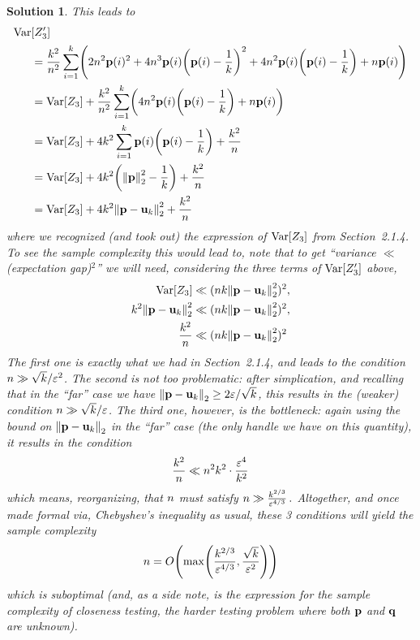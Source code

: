 \documentclass[biber]{nowfnt} %
\newtheorem{solution}{Solution}[chapter]
\begin{document}
\begin{solution}
This leads to
\begin{align*}
      \Var&[Z'_3] \\
      &= \frac{\ab^2}{\ns^2}\sum_{i=1}^\ab \Paren{2\ns^2\p (i)^2 + 4\ns^3\p(i)\Paren{\p(i)-\frac{1}{\ab}} ^2 + 4\ns^2\p(i)\Paren{\p(i)-\frac{1}{\ab}} + \ns\p(i)} \\
      &= \Var[Z_3] + \frac{\ab^2}{\ns^2}\sum_{i=1}^\ab \Paren{4\ns^2\p(i)\Paren{\p(i)-\frac{1}{\ab}} + \ns\p(i)} \\
      &= \Var[Z_3] + 4\ab^2\sum_{i=1}^\ab \p(i)\Paren{\p(i)-\frac{1}{\ab}} + \frac{\ab^2}{\ns}\\
      &= \Var[Z_3] + 4\ab^2\Paren{\normtwo{\p}^2 - \frac{1}{\ab}} + \frac{\ab^2}{\ns} \\
      &= \Var[Z_3] + 4\ab^2\normtwo{\p - \uniformOn{\ab}}^2 + \frac{\ab^2}{\ns}
\end{align*}
where we recognized (and took out) the expression of $\operatorname{Var}[Z_3]$ from Section~2.1.4. To see the sample complexity this would lead to, note that to get ``variance $\ll$ (expectation gap)$^2$'' we will need, considering the three terms of $\operatorname{Var}[Z'_3]$ above,
\begin{align*}
		\Var[Z_3] &\ll (\ns\ab\normtwo{\p-\uniform_\ab}^2)^2,  \\
		\ab^2\normtwo{\p - \uniformOn{\ab}}^2 &\ll (\ns\ab\normtwo{\p-\uniform_\ab}^2)^2,  \\
		\frac{\ab^2}{\ns} &\ll (\ns\ab\normtwo{\p-\uniform_\ab}^2)^2
\end{align*}
The first one is exactly what we had in Section~2.1.4, and leads to the condition $n \gg \sqrt{k}/\varepsilon^2$. The second is not too problematic: after simplication, and recalling that in the ``far'' case we have $\normtwo{\p-\uniform_\ab} \geq 2\dst/\sqrt{\ab}$, this results in the (weaker) condition $n \gg \sqrt{k}/\varepsilon$. The third one, however, is the bottleneck: again using the bound on $\normtwo{\p-\uniform_\ab}$ in the ``far'' case (the only handle we have on this quantity), it results in the condition
\[
		\frac{k^2}{n} \ll n^2k^2 \cdot \frac{\varepsilon^4}{k^2}
\]
which means, reorganizing, that $n$ must satisfy
$
	n \gg \frac{k^{2/3}}{\varepsilon^{4/3}}\,.
$ Altogether, and once made formal via, \eg Chebyshev's inequality as usual, these 3 conditions will yield the sample complexity 
\[
		\ns = \bigO{ \max\Paren{\frac{\ab^{2/3}}{\dst^{4/3}},\frac{\sqrt{\ab}}{\dst^2}} }
\]
which is suboptimal (and, as a side note, is the expression for the sample complexity of \emph{closeness} testing, the harder testing problem where both $\mathbf{p}$ and $\mathbf{q}$ are unknown).
\end{solution}
\end{document}
